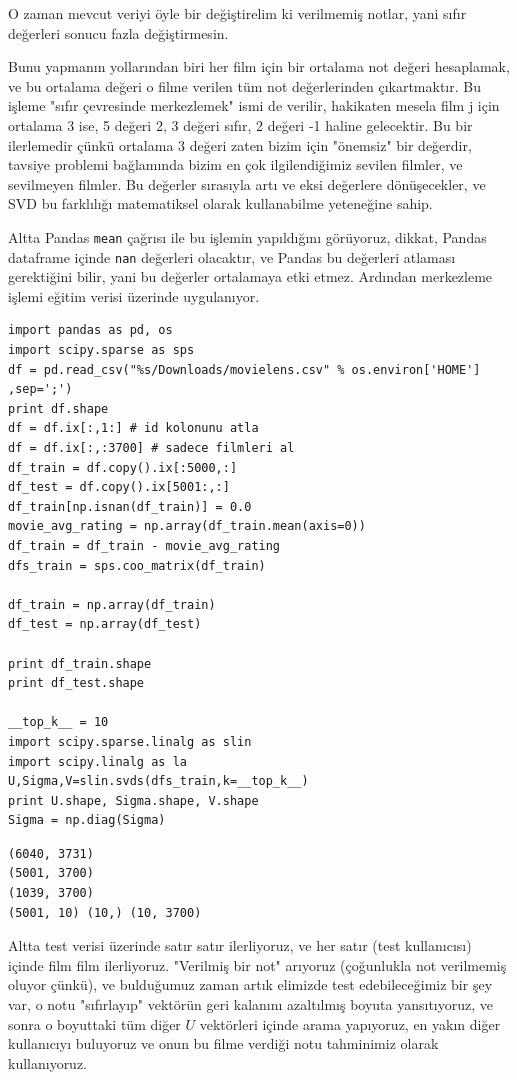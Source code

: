 \documentclass[12pt,fleqn]{article}\usepackage{../../common}
\begin{document}
O zaman mevcut veriyi öyle bir değiştirelim ki verilmemiş notlar, yani
sıfır değerleri sonucu fazla değiştirmesin.

Bunu yapmanın yollarından biri her film için bir ortalama not değeri
hesaplamak, ve bu ortalama değeri o filme verilen tüm not
değerlerinden çıkartmaktır. Bu işleme "sıfır çevresinde merkezlemek"
ismi de verilir, hakikaten mesela film j için ortalama 3 ise, 5 değeri
2, 3 değeri sıfır, 2 değeri -1 haline gelecektir. Bu bir ilerlemedir
çünkü ortalama 3 değeri zaten bizim için "önemsiz" bir değerdir,
tavsiye problemi bağlamında bizim en çok ilgilendiğimiz sevilen
filmler, ve sevilmeyen filmler. Bu değerler sırasıyla artı ve eksi
değerlere dönüşecekler, ve SVD bu farklılığı matematiksel olarak
kullanabilme yeteneğine sahip.

Altta Pandas \verb!mean! çağrısı ile bu işlemin yapıldığını görüyoruz, dikkat,
Pandas dataframe içinde \verb!nan! değerleri olacaktır, ve Pandas bu değerleri
atlaması gerektiğini bilir, yani bu değerler ortalamaya etki etmez. Ardından
merkezleme işlemi eğitim verisi üzerinde uygulanıyor.

\begin{verbatim}
import pandas as pd, os
import scipy.sparse as sps
df = pd.read_csv("%s/Downloads/movielens.csv" % os.environ['HOME'] ,sep=';')
print df.shape
df = df.ix[:,1:] # id kolonunu atla
df = df.ix[:,:3700] # sadece filmleri al
df_train = df.copy().ix[:5000,:]
df_test = df.copy().ix[5001:,:]
df_train[np.isnan(df_train)] = 0.0
movie_avg_rating = np.array(df_train.mean(axis=0))
df_train = df_train - movie_avg_rating
dfs_train = sps.coo_matrix(df_train)

df_train = np.array(df_train)
df_test = np.array(df_test)

print df_train.shape
print df_test.shape

__top_k__ = 10
import scipy.sparse.linalg as slin
import scipy.linalg as la
U,Sigma,V=slin.svds(dfs_train,k=__top_k__)
print U.shape, Sigma.shape, V.shape
Sigma = np.diag(Sigma)
\end{verbatim}

\begin{verbatim}
(6040, 3731)
(5001, 3700)
(1039, 3700)
(5001, 10) (10,) (10, 3700)
\end{verbatim}

Altta test verisi üzerinde satır satır ilerliyoruz, ve her satır (test
kullanıcısı) içinde film film ilerliyoruz. "Verilmiş bir not" arıyoruz
(çoğunlukla not verilmemiş oluyor çünkü), ve bulduğumuz zaman artık
elimizde test edebileceğimiz bir şey var, o notu "sıfırlayıp" vektörün
geri kalanını azaltılmış boyuta yansıtıyoruz, ve sonra o boyuttaki tüm
diğer $U$ vektörleri içinde arama yapıyoruz, en yakın diğer
kullanıcıyı buluyoruz ve onun bu filme verdiği notu tahminimiz olarak
kullanıyoruz.
\end{document}
